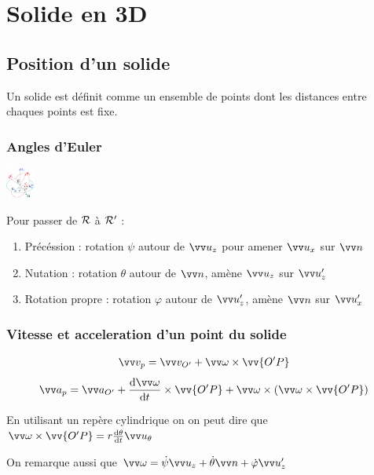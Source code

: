 \documentclass[../main.tex]{subfiles}
\begin{document}
\section{Solide en 3D}
\subsection{Position d'un solide}
Un solide est définit comme un ensemble de points dont les distances entre chaques points est fixe. 

\subsubsection{Angles d'Euler}
\begin{center}
  \includegraphics[width=0.07\textwidth]{images/euler.PNG}
\end{center}

Pour passer de \(\mathcal{R}\) à \(\mathcal{R}'\) : 
\begin{enumerate}
  \item Précéssion : rotation \(\psi\) autour de \(\uz\) pour amener \(\ux\) sur \(\nod\)
  \item Nutation : rotation \(\theta\) autour de \(\nod\), amène \(\uz\) sur \(\uz'\) 
  \item Rotation propre : rotation \(\varphi\) autour de \(\uz'\), amène \(\nod\) sur \(\ux'\) 
\end{enumerate}

\subsubsection{Vitesse et acceleration d'un point du solide}
\[\vi_p=\vi_{O'}+\vian\times\vv{O'P}\]
\[\ac_p=\ac_{O'}+\dv{\vian}{t}\times\vv{O'P}+\vian\times(\vian\times\vv{O'P})\]

En utilisant un repère cylindrique on on peut dire que \(\vian\times\vv{O'P}=r\dv{\theta}{t}\utheta\) 

On remarque aussi que \(\vian = \dot{\psi}\uz + \dot{\theta}\nod + \dot{\varphi}\uz'\)
\end{document}
